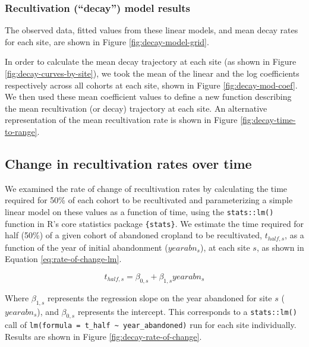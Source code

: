 \documentclass[9pt,twoside,lineno]{pnas-new}
\begin{document}
\hypertarget{recultivation-decay-model-results}{%
\subsubsection{Recultivation (``decay'') model results}\label{recultivation-decay-model-results}}

The observed data, fitted values from these linear models, and mean decay rates for each site, are shown in Figure \ref{fig:decay-model-grid}.

In order to calculate the mean decay trajectory at each site (as shown in Figure \ref{fig:decay-curves-by-site}), we took the mean of the linear and the log coefficients respectively across all cohorts at each site, shown in Figure \ref{fig:decay-mod-coef}.
We then used these mean coefficient values to define a new function describing the mean recultivation (or decay) trajectory at each site.
An alternative representation of the mean recultivation rate is shown in Figure \ref{fig:decay-time-to-range}.

\hypertarget{section-methods-rate-of-change}{%
\subsection{Change in recultivation rates over time}\label{section-methods-rate-of-change}}

We examined the rate of change of recultivation rates by calculating the time required for 50\% of each cohort to be recultivated and parameterizing a simple linear model on these values as a function of time, using the \texttt{stats::lm()} function in R's core statistics package \texttt{\{stats\}}.
We estimate the time required for half (50\%) of a given cohort of abandoned cropland to be recultivated, \(t_{half,s}\), as a function of the year of initial abandonment (\(yearabn_{s}\)), at each site \(s\), as shown in Equation \eqref{eq:rate-of-change-lm}.

\begin{equation}
t_{half,s} = \beta_{0,s} + \beta_{1,s} yearabn_{s} \label{eq:rate-of-change-lm}
\end{equation}

Where \(\beta_{1,s}\) represents the regression slope on the year abandoned for site \(s\) (\(yearabn_{s}\)), and \(\beta_{0,s}\) represents the intercept.
This corresponds to a \texttt{stats::lm()} call of \texttt{lm(formula\ =\ t\_half\ \textasciitilde{}\ year\_abandoned)} run for each site individually.
Results are shown in Figure \ref{fig:decay-rate-of-change}.
\end{document}
